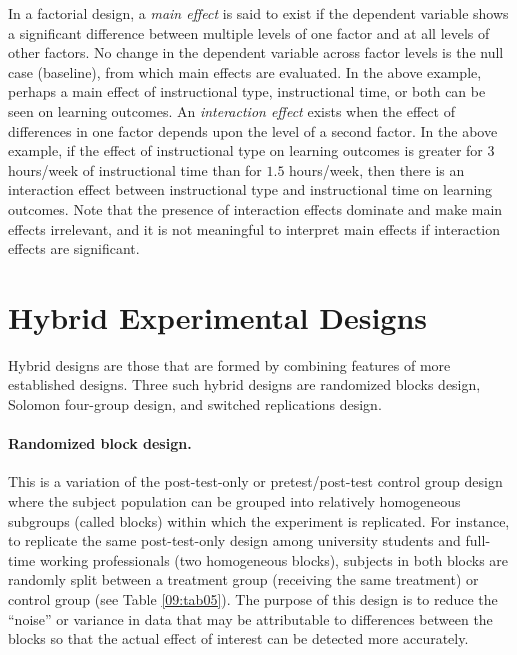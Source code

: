 In a factorial design, a \textit{main effect} is said to exist if the dependent variable shows a significant difference between multiple levels of one factor and at all levels of other factors. No change in the dependent variable across factor levels is the null case (baseline), from which main effects are evaluated. In the above example, perhaps a main effect of instructional type, instructional time, or both can be seen on learning outcomes. An \textit{interaction effect} exists when the effect of differences in one factor depends upon the level of a second factor. In the above example, if the effect of instructional type on learning outcomes is greater for $ 3 $ hours/week of instructional time than for $ 1.5 $ hours/week, then there is an interaction effect between instructional type and instructional time on learning outcomes. Note that the presence of interaction effects dominate and make main effects irrelevant, and it is not meaningful to interpret main effects if interaction effects are significant.

\section{Hybrid Experimental Designs}

Hybrid designs are those that are formed by combining features of more established designs. Three such hybrid designs are randomized blocks design, Solomon four-group design, and switched replications design.

\paragraph{Randomized block design.} This is a variation of the post-test-only or pretest/post-test control group design where the subject population can be grouped into relatively homogeneous subgroups (called blocks) within which the experiment is replicated. For instance, to replicate the same post-test-only design among university students and full-time working professionals (two homogeneous blocks), subjects in both blocks are randomly split between a treatment group (receiving the same treatment) or control group (see Table \ref{09:tab05}). The purpose of this design is to reduce the ``noise'' or variance in data that may be attributable to differences between the blocks so that the actual effect of interest can be detected more accurately.

